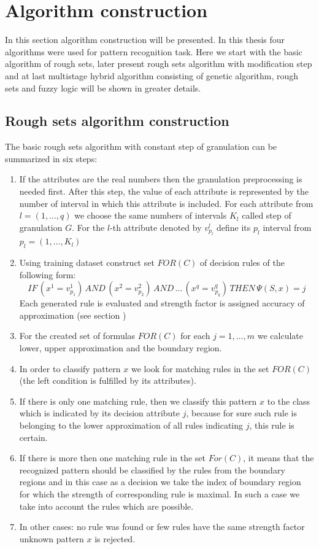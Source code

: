 \section{Algorithm construction}
\label{cha:Algorithm_construction}
In this section algorithm construction will be presented. In this thesis four
algorithms were used for pattern recognition task. Here we start with the basic
algorithm of rough sets, later present rough sets algorithm with modification
step and at last multistage hybrid algorithm consisting of genetic algorithm,
rough sets and fuzzy logic will be shown in greater details. 
\subsection{Rough sets algorithm construction}
\label{cha:Algorithm_construction_rough_set}
The basic rough sets algorithm with constant step of granulation
can be summarized in six steps:
\begin{enumerate}
    \item If the attributes are the real numbers then the granulation preprocessing 
        is needed first. After this step, the value of each attribute is represented 
        by the number of interval in which this attribute is included. For each
        attribute from $l=(1, \ldots , q)$ we choose the same numbers of
        intervals $K_l$ called step of granulation $G$. For the $l$-th attribute 
        denoted by $v^l_{p_l}$ define
        its $p_l$ interval from $p_l=(1, \ldots, K_l)$
    \item Using training dataset construct set $FOR(C)$ of decision rules of
        the following form:
        $$IF \, (x^1 = v_{p_1}^1) \, AND \, (x^2=v_{p_2}^2) \, AND \, \ldots \,
        (x^q=v_{p_q}^q) \, THEN \, \Psi(S, x)=j$$
        Each generated rule is evaluated and strength factor is assigned
        accuracy of approximation (see section \label{cha:Rough_sets_indicators})
    \item For the created set of formulas $FOR(C)$ for each $j=1, \ldots, m$ we
        calculate lower, upper approximation and the boundary region.
    \item In order to classify pattern $x$ we look for matching rules in the
        set $FOR(C)$ (the left condition is fulfilled by its attributes).
    \item If there is only one matching rule, then we classify this pattern $x$ 
        to the class  which is indicated by its decision attribute $j$, 
        because for sure such rule is belonging to the lower approximation of all rules 
        indicating $j$, this rule is certain.
    \item If there is more then one matching rule in the set $For(C)$, 
        it means that the recognized pattern should be classified by the 
        rules from the boundary regions and in this case as a decision we 
        take the index of boundary region for which the strength of corresponding 
        rule is maximal. In such a case we take into account the rules which are possible.
    \item In other cases: no rule was found or few rules have the same strength
        factor unknown pattern $x$ is rejected.
\end{enumerate}
